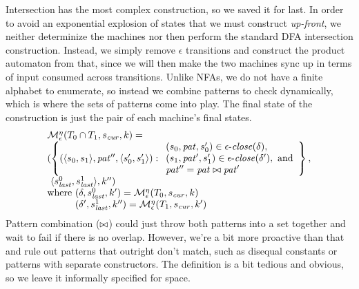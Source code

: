 Intersection has the most complex construction, so we saved it for last.
%
In order to avoid an exponential explosion of states that we must construct \emph{up-front}, we neither determinize the machines nor then perform the standard DFA intersection construction.
%
Instead, we simply remove $\epsilon$ transitions and construct the product automaton from that, since we will then make the two machines sync up in terms of input consumed across transitions.
%
Unlike NFAs, we do not have a finite alphabet to enumerate, so instead we combine patterns to check dynamically, which is where the sets of patterns come into play.
%
The final state of the construction is just the pair of each machine's final states.
\begin{align*}
  \begin{array}{l}
  \epshelp^\mtimeline(\stAnd{\mtcon_0}{\mtcon_1}, \pmsmqcur, k) = \\
  (\left\{(\pmsmpair{\pmsmqq_0}{\pmsmqq_1}, \mpat'', \pmsmpair{\pmsmqq'_0}{\pmsmqq'_1}) :
          \begin{array}{l}
                (\pmsmqq_0, \mpat, \pmsmqq'_0) \in \epsclose(\delta),\\
                (\pmsmqq_1, \mpat', \pmsmqq'_1) \in \epsclose(\delta'), \text{ and}\\
                \mpat'' = \combinepat{\mpat}{\mpat'}
           \end{array} \right\},\\
  \ \pmsmpair{\pmsmqlast^0}{\pmsmqlast^1}, k'') \\
  \text{where } (\delta, \pmsmqlast^0, k') = \epshelp^\mtimeline(\mtcon_0, \pmsmqcur, k) \\
  \phantom{\text{where }} (\delta', \pmsmqlast^1, k'') = \epshelp^\mtimeline(\mtcon_1, \pmsmqcur, k')
\end{array}
\end{align*}
%
Pattern combination ($\bowtie$) could just throw both patterns into a set together and wait to fail if there is no overlap.
%
However, we're a bit more proactive than that and rule out patterns that outright don't match, such as disequal constants or patterns with separate constructors.
%
The definition is a bit tedious and obvious, so we leave it informally specified for space.

